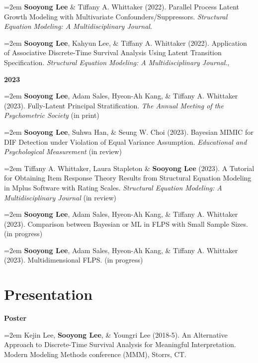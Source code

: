 \documentclass[11pt,a4paper,]{awesome-cv}
\begin{document}
\hangindent=2em  \textbf{Sooyong Lee} \& Tiffany A.
Whittaker (2022). Parallel Process Latent Growth Modeling with
Multivariate Confounders/Suppressors. \emph{Structural Equation
Modeling: A Multidisciplinary Journal}.

\hangindent=2em  \textbf{Sooyong Lee}, Kahyun Lee, \&
Tiffany A. Whittaker (2022). Application of Associative Discrete-Time
Survival Analysis Using Latent Transition Specification.
\emph{Structural Equation Modeling: A Multidisciplinary Journal}.,

\setlength{\leftskip}{0cm}

\textbf{2023}

\setlength{\leftskip}{0.5cm}

\hangindent=2em  \textbf{Sooyong Lee}, Adam Sales, Hyeon-Ah
Kang, \& Tiffany A. Whittaker (2023). Fully-Latent Principal
Stratification. \emph{The Annual Meeting of the Psychometric Society}
(in print)

\hangindent=2em  \textbf{Sooyong Lee}, Suhwa Han, \& Seung
W. Choi (2023). Bayesian MIMIC for DIF Detection under Violation of
Equal Variance Assumption. \emph{Educational and Psychological
Measurement} (in review)

\hangindent=2em  Tiffany A. Whittaker, Laura Stapleton \&
\textbf{Sooyong Lee} (2023). A Tutorial for Obtaining Item Response
Theory Results from Structural Equation Modeling in Mplus Software with
Rating Scales. \emph{Structural Equation Modeling: A Multidisciplinary
Journal} (in review)

\hangindent=2em  \textbf{Sooyong Lee}, Adam Sales, Hyeon-Ah
Kang, \& Tiffany A. Whittaker (2023). Comparison between Bayesian or ML
in FLPS with Small Sample Sizes. (in progress)

\hangindent=2em  \textbf{Sooyong Lee}, Adam Sales, Hyeon-Ah
Kang, \& Tiffany A. Whittaker (2023). Multidimensional FLPS. (in
progress)

\setlength{\leftskip}{0cm}

\hypertarget{presentation}{%
\section{Presentation}\label{presentation}}

\setlength{\leftskip}{0cm}

\textbf{Poster}

\setlength{\leftskip}{0.5cm}

\hangindent=2em  Kejin Lee, \textbf{Sooyong Lee}, \& Youngri
Lee (2018-5). An Alternative Approach to Discrete-Time Survival Analysis
for Meaningful Interpretation. Modern Modeling Methods conference (MMM),
Storrs, CT.
\end{document}
